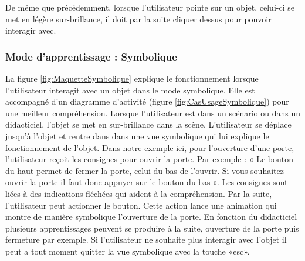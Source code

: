 De même que précédemment, lorsque l'utilisateur pointe sur un objet, celui-ci se met en légère sur-brillance, il doit par la suite cliquer dessus pour pouvoir interagir avec. %


\subsubsection{Mode d'apprentissage : Symbolique}

La figure \ref{fig:MaquetteSymbolique} explique le fonctionnement lorsque l'utilisateur interagit avec un objet dans le mode symbolique. Elle est accompagné d'un diagramme d'activité (figure \ref{fig:CasUsageSymbolique}) pour une meilleur compréhension.
\newline
Lorsque l'utilisateur est dans un scénario ou dans un didacticiel, l'objet se met en sur-brillance dans la scène. L'utilisateur se déplace jusqu'à l'objet et rentre dans dans une vue symbolique qui lui explique le fonctionnement de l'objet. Dans notre exemple ici, pour l'ouverture d'une porte, l'utilisateur reçoit les consignes pour ouvrir la porte. Par exemple : « Le bouton du haut permet de fermer la porte, celui du bas de l'ouvrir. Si vous souhaitez ouvrir la porte il faut donc appuyer sur le bouton du bas ». Les consignes sont liées à des indications fléchées qui aident à la compréhension. Par la suite, l'utilisateur peut actionner le bouton. Cette action lance une animation qui montre de manière symbolique l'ouverture de la porte.
\newline
En fonction du didacticiel plusieurs apprentissages peuvent se produire à la suite, ouverture de la porte puis fermeture par exemple. Si l'utilisateur ne souhaite plus interagir avec l'objet il peut a tout moment quitter la vue symbolique avec la touche «esc».

